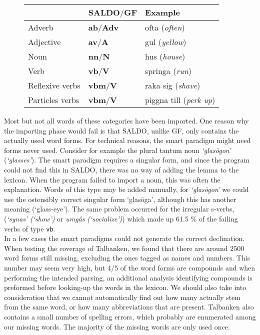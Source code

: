 \documentclass[10pt, a4paper]{article}
\begin{document}
\begin{figure}[h]
\begin{tabular}{|l|ll|}
\hline
& SALDO$/$GF & Example \\
\hline
 Adverb & \textbf{ab}$/$\textbf{Adv} & ofta (\emph{often})\\
 Adjective&\textbf{av}$/$\textbf{A} & gul (\emph{yellow})\\
 Noun & \textbf{nn}$/$\textbf{N} & hus (\emph{house})\\
 Verb & \textbf{vb}$/$\textbf{V} & springa (\emph{run})\\
 Reflexive verbs &\textbf{vbm}$/$\textbf{V} & raka sig (\emph{shave})\\
 Particles verbs &\textbf{vbm}$/$\textbf{V}  &  piggna till (\emph{perk up})\\
\hline
\end{tabular}
\caption{}
\end{figure}

Most but not all words of these categories have been imported.
One reason why the importing phase would fail 
is that SALDO, unlike GF, only contains the actually used word forms.
For technical reasons, the smart paradigm might need forms never used.
Consider for example the plural tantum 
noun \emph{`glas{\"o}gon'} (\emph{`glasses'}).
The smart paradigm requires a singular form, and since the program could not
find this in SALDO, there was no way of adding the lemma to the lexicon. 
When the program failed to import a noun, this was often the explanation.
Words of this type may be added manually, for \emph{`glas{\"o}gon'} we could use
the ostensibly correct singular form `glas{\"o}ga', although this
has another meaning (`glass-eye').
The same problem occurred for the irregular s-verbs,
(\emph{`synas'} \emph{(`show')} or \emph{umg{\aa}s} \emph{(`socialize')})
which made up 61.5 \% of the failing verbs of type \verb_vb_.\\
In a few cases the smart paradigms could not generate the correct declination.\\

When testing the coverage of Talbanken,
we found that there are around 2500 word forms still missing, excluding the ones
tagged as names and numbers. This number may seem very high, but 
4/5 of the word forms are compounds and when performing the intended parsing,
an additional analysis identifying compounds is preformed before
looking-up the words in the lexicon. We
should also take into consideration that 
we cannot automatically find out how many actually stem from the same word, or
how many abbreviations that are present. Talbanken also contains a small number of 
spelling errors, which probably are enumerated among our missing words. The majority
of the missing words are only used once.\\
\end{document}
